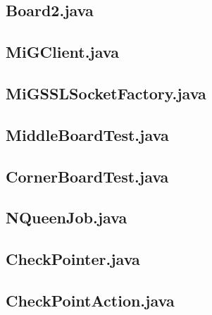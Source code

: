 \begin{landscape}
\begin{multicols}{2}
\subsection{Board2.java}

\subsection{MiGClient.java}

\subsection{MiGSSLSocketFactory.java}

\subsection{MiddleBoardTest.java}

\subsection{CornerBoardTest.java}

\subsection{NQueenJob.java}

\subsection{CheckPointer.java}

\subsection{CheckPointAction.java}


\end{multicols}
\end{landscape}
